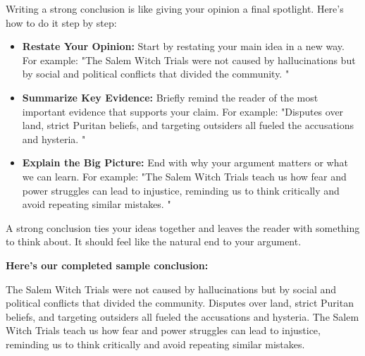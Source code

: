 \documentclass[12pt]{article}
\begin{document}
\begin{tcolorbox}[colframe=black!60, colback=white, 
coltitle=black, colbacktitle=black!15, fonttitle=\bfseries\Large, 
title=Example: How to Write a Conclusion, halign title=center, left=10pt, right=10pt, top=10pt, bottom=15pt]
Writing a strong conclusion is like giving your opinion a final spotlight. Here’s how to do it step by step:
\begin{itemize}
    \item \textbf{Restate Your Opinion:} Start by restating your main idea in a new way. For example: "The Salem Witch Trials were not caused by hallucinations but by social and political conflicts that divided the community. "
    \item \textbf{Summarize Key Evidence:} Briefly remind the reader of the most important evidence that supports your claim.   For example: "Disputes over land, strict Puritan beliefs, and targeting outsiders all fueled the accusations and hysteria. "
    \item \textbf{Explain the Big Picture:} End with why your argument matters or what we can learn. For example: "The Salem Witch Trials teach us how fear and power struggles can lead to injustice, reminding us to think critically and avoid repeating similar mistakes. "
\end{itemize}

A strong conclusion ties your ideas together and leaves the reader with something to think about. It should feel like the natural end to your argument. 

\textbf{Here’s our completed sample conclusion:}

The Salem Witch Trials were not caused by hallucinations but by social and political conflicts that divided the community. Disputes over land, strict Puritan beliefs, and targeting outsiders all fueled the accusations and hysteria. The Salem Witch Trials teach us how fear and power struggles can lead to injustice, reminding us to think critically and avoid repeating similar mistakes. 
\end{tcolorbox}

\vspace{1em}
\end{document}
